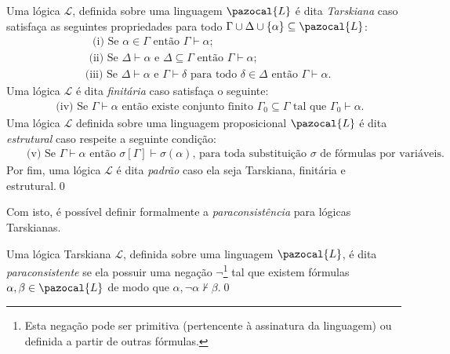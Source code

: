 \begin{definicao}
    \label{def:padrao}
    Uma lógica $\mathcal{L}$, definida sobre uma linguagem $\pazocal{L}$ é dita \textit{Tarskiana} caso satisfaça as seguintes propriedades para todo $\Gamma \cup \Delta \cup \{\alpha\} \subseteq \pazocal{L}$:
    \begin{align*}
         & \text{~~(i) Se } \alpha \in \Gamma \text{ então } \Gamma \vdash \alpha;                                                                       \\
         & \text{~(ii) Se } \Delta \vdash \alpha \text{ e } \Delta \subseteq \Gamma \text{ então } \Gamma \vdash \alpha;                                 \\
         & \text{(iii) Se } \Delta \vdash \alpha \text{ e } \Gamma \vdash \delta \text{ para todo } \delta \in \Delta \text{ então } \Gamma \vdash \alpha.
    \end{align*}
    Uma lógica $\mathcal{L}$ é dita \textit{finitária} caso satisfaça o seguinte:
    \begin{align*}
         & \text{~(iv) Se } \Gamma \vdash \alpha \text{ então existe conjunto finito } \Gamma_{0} \subseteq \Gamma \text{ tal que } \Gamma_{0} \vdash \alpha.
    \end{align*}
    Uma lógica $\mathcal{L}$ definida sobre uma linguagem proposicional $\pazocal{L}$ é dita \textit{estrutural} caso respeite a seguinte condição:
    \begin{align*}
         & \text{~~(v) Se } \Gamma \vdash \alpha \text{ então } \sigma [\Gamma] \vdash \sigma(\alpha) \text{, para toda substituição } \sigma \text{ de fórmulas por variáveis.}
    \end{align*}
    Por fim, uma lógica $\mathcal{L}$ é dita \textit{padrão} caso ela seja Tarskiana, finitária e estrutural.\qed{}
\end{definicao}
Com isto, é possível definir formalmente a \textit{paraconsistência} para lógicas Tarskianas.

\begin{definicao}
    \label{def:tarskiana_paracons}
    Uma lógica Tarskiana $\mathcal{L}$, definida sobre uma linguagem $\pazocal{L}$, é dita \textit{paraconsistente} se ela possuir uma negação $\neg$\footnote{Esta negação pode ser primitiva (pertencente à assinatura da linguagem) ou definida a partir de outras fórmulas.} tal que existem fórmulas $\alpha, \beta \in \pazocal{L}$ de modo que $\alpha, \neg \alpha \nvdash \beta$.\qed{}
\end{definicao}

